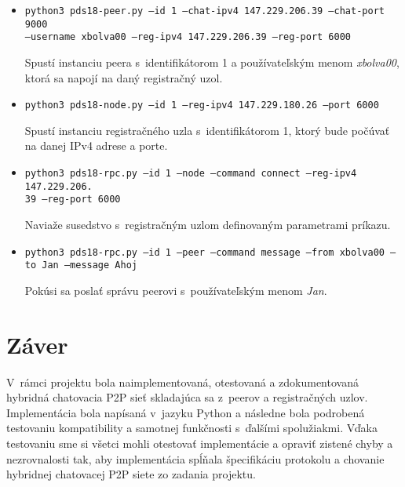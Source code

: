 \begin{itemize}
	\item \texttt{python3 pds18-peer.py --id 1 --chat-ipv4 147.229.206.39 --chat-port 9000\\ --username xbolva00 --reg-ipv4 147.229.206.39 --reg-port 6000}
	
	Spustí instanciu peera s~identifikátorom 1 a používateľským menom \textit{xbolva00}, ktorá sa napojí na daný registračný uzol.
	
	\item \texttt{python3 pds18-node.py --id 1 --reg-ipv4 147.229.180.26 --port 6000}
	
	Spustí instanciu registračného uzla s~identifikátorom 1, ktorý bude počúvať na danej IPv4 adrese a porte.
	
	\item \texttt{python3 pds18-rpc.py --id 1 --node --command connect --reg-ipv4 147.229.206.\\39 --reg-port 6000}
	
	Naviaže susedstvo s~registračným uzlom definovaným parametrami príkazu.
	
	\item \texttt{python3 pds18-rpc.py --id 1 --peer --command message --from xbolva00 --to Jan --message Ahoj}
	
	Pokúsi sa poslať správu  peerovi s~používateľským menom \textit{Jan}.
\end{itemize}

\chapter{Záver}
V~rámci projektu bola naimplementovaná, otestovaná a zdokumentovaná hybridná chatovacia P2P sieť skladajúca sa z~peerov a registračných uzlov. Implementácia bola napísaná v~jazyku Python a následne bola podrobená testovaniu kompatibility a samotnej funkčnosti s~ďalšími spolužiakmi. Vďaka testovaniu sme si všetci mohli otestovať implementácie a opraviť zistené chyby a nezrovnalosti tak, aby implementácia spĺňala špecifikáciu protokolu a chovanie hybridnej chatovacej P2P siete zo zadania projektu.
